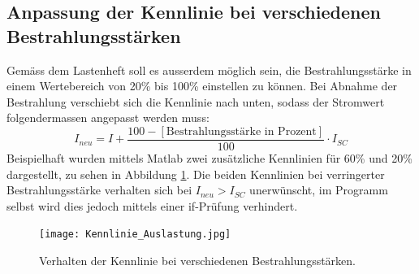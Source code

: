 \subsection{Anpassung der Kennlinie bei verschiedenen Bestrahlungsstärken}\label{subsec_prozent}
Gemäss dem Lastenheft soll es ausserdem möglich sein, die Bestrahlungsstärke in einem Wertebereich von 20\% bis 100\% einstellen zu können. Bei Abnahme der Bestrahlung verschiebt sich die Kennlinie nach unten, sodass der Stromwert folgendermassen angepasst werden muss:
\begin{equation}
	I_{neu}=I+\frac{100-\left[\text{Bestrahlungsstärke in Prozent}\right]}{100}\cdot I_{SC}
\label{eq:kennlinie_prozent}
\end{equation}
Beispielhaft wurden mittels Matlab zwei zusätzliche Kennlinien für 60\% und 20\% dargestellt, zu sehen in Abbildung \ref{fig:Kennlinie_Auslastung}. Die beiden Kennlinien bei verringerter Bestrahlungsstärke verhalten sich bei $I_{neu}>I_{SC}$ unerwünscht, im Programm selbst wird dies jedoch mittels einer if-Prüfung verhindert.
\begin{figure}
	\centering
		\texttt{[image: Kennlinie\_Auslastung.jpg]}
	\caption{Verhalten der Kennlinie bei verschiedenen Bestrahlungsstärken.}
	\label{fig:Kennlinie_Auslastung}
\end{figure}
